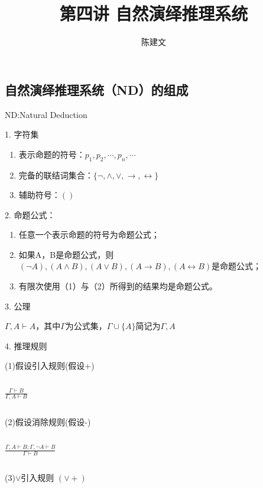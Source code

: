 \documentclass{article}
\begin{document}
\begin{CJK*}{UTF8}{gbsn}
  \title{第四讲 自然演绎推理系统}
  \author{陈建文}
  \maketitle
  \section{自然演绎推理系统（ND）的组成}

  ND:Natural Deduction

  
    1. 字符集

    \begin{enumerate}
      \item 表示命题的符号：$p_1,p_2,\cdots,p_n,\cdots$
      \item 完备的联结词集合：$\{\lnot, \land, \lor, \to, \leftrightarrow \}$
      \item 辅助符号：$()$
    \end{enumerate}

    2. 命题公式：

    \begin{enumerate}
      \item 任意一个表示命题的符号为命题公式；
      \item 如果A，B是命题公式，则$(\lnot A), (A\land B), (A\lor B), (A\to B), (A\leftrightarrow B)$是命题公式；
      \item 有限次使用（1）与（2）所得到的结果均是命题公式。
    \end{enumerate}

    3. 公理  
  
    $\Gamma,A\vdash  A$，其中$\Gamma$为公式集，$\Gamma\cup \{A\}$简记为$\Gamma,A$



     4. 推理规则 
    
    (1)假设引入规则(假设+)

    $\quad$

    {\LARGE$\frac{\Gamma\vdash B}{\Gamma,A\vdash B}$}

    $\quad$

    (2)假设消除规则(假设-)

    $\quad$

    {\LARGE $\frac{\Gamma,A\vdash B;\Gamma,\lnot A\vdash B}{\Gamma\vdash B}$}

    $\quad$

    (3)$\lor$引入规则 $(\lor +)$


\end{CJK*}
\end{document}
